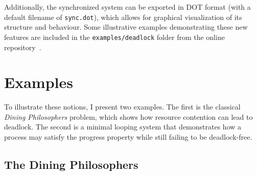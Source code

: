 
Additionally, the synchronized system can be exported in DOT format
(with a default filename of \verb|sync.dot|), which allows for graphical 
visualization of its structure and behaviour. Some illustrative examples 
demonstrating these new features are included in the
\verb|examples/deadlock| folder from the online repository~\cite{rescurepo}.


\section{Examples}

To illustrate these notions, I present two examples. The first is the
classical \emph{Dining Philosophers} problem, which shows how resource
contention can lead to deadlock. The second is a minimal looping system
that demonstrates how a process may satisfy the progress property while
still failing to be deadlock-free.

\subsection{The Dining Philosophers}


